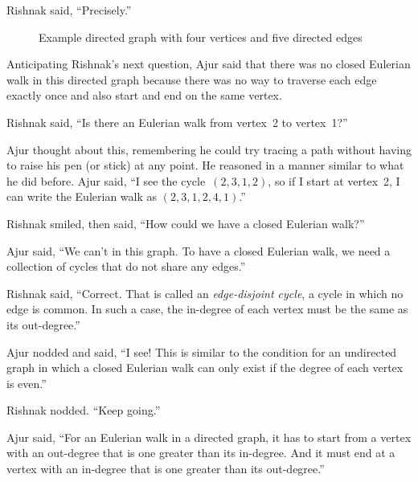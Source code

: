 Rishnak said, ``Precisely.''

\begin{figure}
\begin{center}
\caption{Example directed graph with four vertices and five directed edges}\label{4g5}
\end{center}
\end{figure}


Anticipating Rishnak's next question, Ajur said that there was no closed Eulerian walk in this directed graph because there was no way to traverse each edge exactly once and also start and end on the same vertex.

Rishnak said, ``Is there an Eulerian walk from vertex~2 to vertex~1?''

Ajur thought about this, remembering he could try tracing a path without having to raise his pen (or stick) at any point. He reasoned in a manner similar to what he did before. Ajur said, ``I see the cycle~$(2,3,1,2)$, so if I start at vertex~2, I can write the Eulerian walk as $(2,3,1,2,4,1)$.''

Rishnak smiled, then said, ``How could we have a closed Eulerian walk?''

Ajur said, ``We can't in this graph. To have a closed Eulerian walk, we need a collection of cycles that do not share any edges.''

Rishnak said, ``Correct. That is called an \textit{edge-disjoint cycle}, a cycle in which no edge is common. In such a case, the in-degree of each vertex must be the same as its out-degree.''

Ajur nodded and said, ``I see! This is similar to the condition for an undirected graph in which a closed Eulerian walk can only exist if the degree of each vertex is even.''

Rishnak nodded. ``Keep going.''

Ajur said, ``For an Eulerian walk in a directed graph, it has to start from a vertex with an out-degree that is one greater than its in-degree. And it must end at a vertex with an in-degree that is one greater than its out-degree.''

